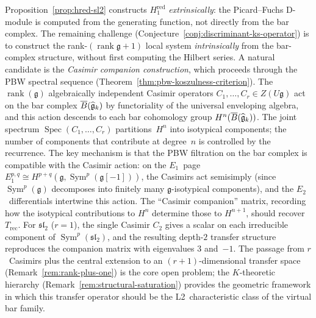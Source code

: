 \begin{remark}\label{rem:hred-intrinsic}
Proposition~\ref{prop:hred-sl2} constructs $H^{\mathrm{red}}_1$
\emph{extrinsically}: the Picard--Fuchs D-module is computed from
the generating function, not directly from the bar complex.
The remaining challenge
(Conjecture~\ref{conj:discriminant-ks-operator}) is to
construct the rank-$(\operatorname{rank}\mathfrak{g}{+}1)$
local system \emph{intrinsically} from the bar-complex structure,
without first computing the Hilbert series.
A natural candidate is the \emph{Casimir companion construction},
which proceeds through the PBW spectral sequence
(Theorem~\ref{thm:pbw-koszulness-criterion}).
The $\operatorname{rank}(\mathfrak{g})$ algebraically independent
Casimir operators $C_1, \ldots, C_r \in Z(U\mathfrak{g})$ act on
the bar complex $\overline{B}(\widehat{\mathfrak{g}}_k)$ by functoriality
of the universal enveloping algebra, and this action descends to
each bar cohomology group
$H^n(\overline{B}(\widehat{\mathfrak{g}}_k))$.  The joint spectrum
$\operatorname{Spec}(C_1, \ldots, C_r)$ partitions~$H^n$ into
isotypical components; the number of components that contribute
at degree~$n$ is controlled by the recurrence.
The key mechanism is that the PBW filtration on the bar complex is
compatible with the Casimir action: on the $E_1$~page
$E_1^{p,q} \cong H^{p+q}(\mathfrak{g}, \operatorname{Sym}^p
(\mathfrak{g}[-1]))$, the Casimirs act semisimply (since
$\operatorname{Sym}^p(\mathfrak{g})$ decomposes into finitely many
$\mathfrak{g}$-isotypical components), and the $E_2$~differentials
intertwine this action.  The ``Casimir companion'' matrix, recording
how the isotypical contributions to $H^n$ determine those
to $H^{n+1}$, should recover~$T_{\mathrm{rec}}$.
For $\mathfrak{sl}_2$ ($r = 1$), the single Casimir $C_2$ gives a
scalar on each irreducible component of $\operatorname{Sym}^p
(\mathfrak{sl}_2)$, and the resulting depth-$2$ transfer structure
reproduces the companion matrix with eigenvalues $3$ and~$-1$.
The passage from $r$~Casimirs plus the central extension to an
$(r{+}1)$-dimensional transfer space
(Remark~\ref{rem:rank-plus-one}) is the core open problem; the
$K$-theoretic hierarchy
(Remark~\ref{rem:structural-saturation}) provides the
geometric framework in which this transfer operator
should be the L2~characteristic class of the virtual bar family.
\end{remark}

